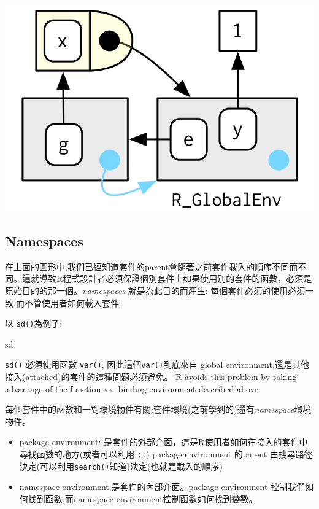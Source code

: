 \documentclass[]{book}
\newenvironment{Shaded}{\begin{snugshade}}{\end{snugshade}}
\newcommand{\NormalTok}[1]{#1}
\theoremstyle{definition}
\theoremstyle{definition}
\theoremstyle{definition}
\theoremstyle{remark}
\begin{document}
\begin{center}\includegraphics{diagrams/environments/binding-2} \end{center}

\subsection{Namespaces}\label{namespaces}

在上面的圖形中,我們已經知道套件的parent會隨著之前套件載入的順序不同而不同。這就導致R程式設計者必須保證個別套件上如果使用別的套件的函數，必須是原始目的的那一個。\emph{namespaces}
就是為此目的而產生: 每個套件必須的使用必須一致,而不管使用者如何載入套件.

以 \texttt{sd()}為例子:

\begin{Shaded}
\begin{Highlighting}[]
\NormalTok{sd}
\end{Highlighting}
\end{Shaded}

\texttt{sd()} 必須使用函數 \texttt{var()},
因此這個\texttt{var()}到底來自 global
environment,還是其他接入(attached)的套件的這種問題必須避免。 R avoids
this problem by taking advantage of the function vs.~binding environment
described above.

每個套件中的函數和一對環境物件有關:套件環境(之前學到的)還有\emph{namespace}環境物件。

\begin{itemize}
\item
  package environment:
  是套件的外部介面，這是R使用者如何在接入的套件中尋找函數的地方(或者可以利用
  \texttt{::}) package enviromnent 的parent
  由搜尋路徑決定(可以利用\texttt{search()}知道)決定(也就是載入的順序)
\item
  namespace environment:是套件的內部介面。package environment
  控制我們如何找到函數,而namespace environment控制函數如何找到變數。
\end{itemize}
\end{document}
